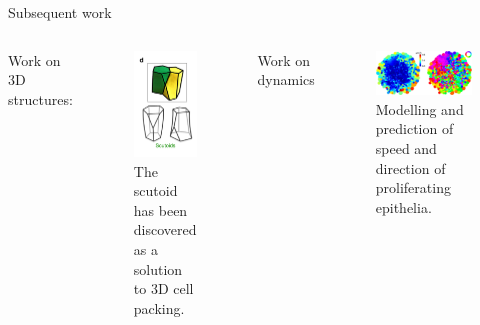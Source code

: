\documentclass[aspectratio=169, 10pt]{beamer}
\begin{document}
\begin{frame}[fragile]{Subsequent work}
  \begin{columns}[T,onlytextwidth]
    Work on 3D structures:
    \begin{figure}
      \centering
      \includegraphics[width=.3\textwidth]{figures/scutoids.png}
      \caption{The scutoid has been discovered as a solution to 3D cell packing.\cite{gomez2018scutoids}}
    \end{figure}
    Work on dynamics
    \begin{figure}
      \centering
      \includegraphics[width=\textwidth]{figures/Cell_Dynamics.jpg}
      \caption{Modelling and prediction of speed and direction of proliferating epithelia. \cite{aland2015mechanistic}}
      \label{}
    \end{figure}
  \end{columns}
\end{frame}
\end{document}
